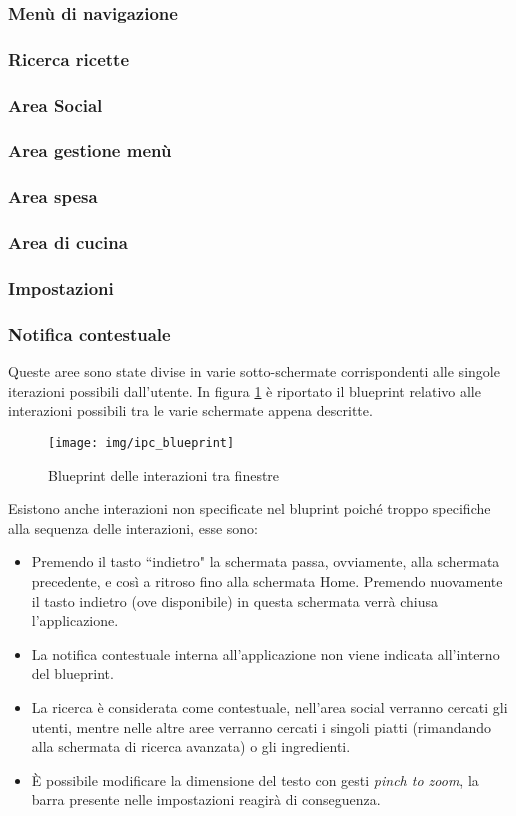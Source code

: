 \subsubsection{Menù di navigazione}
\subsubsection{Ricerca ricette}
\subsubsection{Area Social}
\subsubsection{Area gestione menù}
\subsubsection{Area spesa}
\subsubsection{Area di cucina}
\subsubsection{Impostazioni}
\subsubsection{Notifica contestuale}

Queste aree sono state divise in varie sotto-schermate corrispondenti alle
singole iterazioni possibili dall'utente.  In figura \ref{fig:blueprint}
è riportato il blueprint relativo alle interazioni possibili tra le varie schermate appena descritte.
\begin{figure}[H]
	\centering
	\caption{Blueprint delle interazioni tra finestre}
	\texttt{[image: img/ipc\_blueprint]}
	\label{fig:blueprint}
\end{figure}
Esistono anche interazioni non specificate nel bluprint poiché troppo specifiche
alla sequenza delle interazioni, esse sono:
\begin{itemize}
	\item Premendo il tasto ``indietro" la schermata passa, ovviamente, alla
	schermata precedente, e così a ritroso fino alla schermata Home.
	Premendo nuovamente il tasto indietro (ove disponibile) in questa
	schermata verrà chiusa l'applicazione.
	\item La notifica contestuale interna all'applicazione non viene
	indicata all'interno del blueprint.
	\item La ricerca è considerata come contestuale, nell'area social
	verranno cercati gli utenti, mentre nelle altre aree verranno cercati i
	singoli piatti (rimandando alla schermata di ricerca avanzata)
	o gli ingredienti.
	\item È possibile modificare la dimensione del testo con gesti \emph{pinch to
	zoom}, la barra presente nelle impostazioni reagirà di conseguenza.
\end{itemize}

